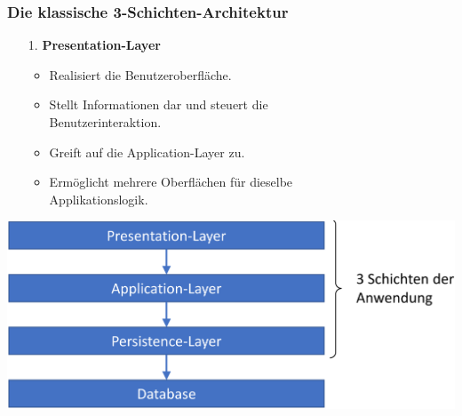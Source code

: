 \documentclass[11pt, a4paper]{article}
\begin{document}
\subsubsection{Die klassische 3-Schichten-Architektur}

\vspace{1em}

\begin{minipage}[h]{0.60\textwidth}
    \tiny
    \begin{enumerate}
        \item[1.] \textbf{Presentation-Layer}
        \begin{itemize}
            \item Realisiert die Benutzeroberfläche.
            \item Stellt Informationen dar und steuert die\\ Benutzerinteraktion.
            \item Greift auf die Application-Layer zu.
            \item Ermöglicht mehrere Oberflächen für dieselbe\\ Applikationslogik.
        \end{itemize}
    \end{enumerate}
\end{minipage}
\begin{minipage}[h]{0.35\textwidth}
    \raggedleft \includegraphics[width=1\textwidth]{Archmuster-00.png}
\end{minipage}

\vspace{1em}
\end{document}
